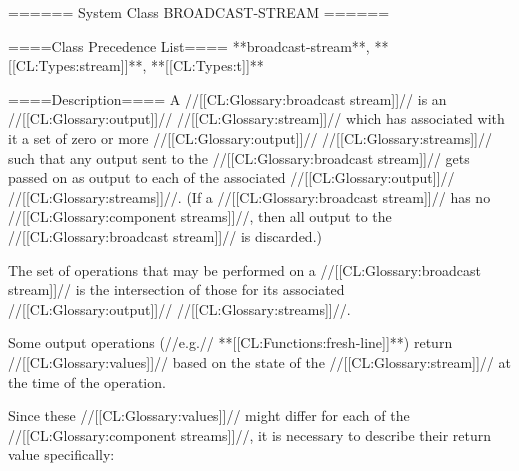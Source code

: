 ====== System Class BROADCAST-STREAM ======

====Class Precedence List====
**broadcast-stream**, **[[CL:Types:stream]]**, **[[CL:Types:t]]**

====Description====
A //[[CL:Glossary:broadcast stream]]// is an //[[CL:Glossary:output]]// //[[CL:Glossary:stream]]// which has associated with it a set of zero or more //[[CL:Glossary:output]]// //[[CL:Glossary:streams]]// such that any output sent to the //[[CL:Glossary:broadcast stream]]// gets passed on as output to each of the associated //[[CL:Glossary:output]]// //[[CL:Glossary:streams]]//. (If a //[[CL:Glossary:broadcast stream]]// has no //[[CL:Glossary:component streams]]//, then all output to the //[[CL:Glossary:broadcast stream]]// is discarded.)

The set of operations that may be performed on a //[[CL:Glossary:broadcast stream]]// is the intersection of those for its associated //[[CL:Glossary:output]]// //[[CL:Glossary:streams]]//.

Some output operations (//e.g.// **[[CL:Functions:fresh-line]]**) return //[[CL:Glossary:values]]// based on the state of the //[[CL:Glossary:stream]]// at the time of the operation.

Since these //[[CL:Glossary:values]]// might differ for each of the //[[CL:Glossary:component streams]]//, it is necessary to describe their return value specifically:

